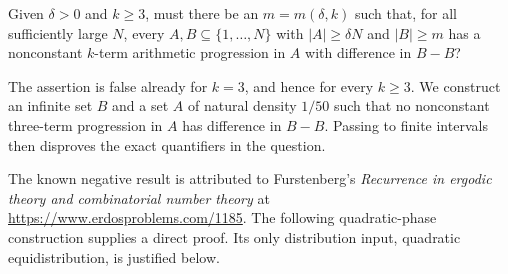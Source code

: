 Given $\delta>0$ and $k\ge3$, must there be an $m=m(\delta,k)$ such that, for all sufficiently large $N$, every $A,B\subseteq\{1,\ldots,N\}$ with $|A|\ge\delta N$ and $|B|\ge m$ has a nonconstant $k$-term arithmetic progression in $A$ with difference in $B-B$?

The assertion is false already for $k=3$, and hence for every $k\ge3$. We construct an infinite set $B$ and a set $A$ of natural density $1/50$ such that no nonconstant three-term progression in $A$ has difference in $B-B$. Passing to finite intervals then disproves the exact quantifiers in the question.

The known negative result is attributed to Furstenberg's \emph{Recurrence in ergodic theory and combinatorial number theory} at \url{https://www.erdosproblems.com/1185}. The following quadratic-phase construction supplies a direct proof. Its only distribution input, quadratic equidistribution, is justified below.
